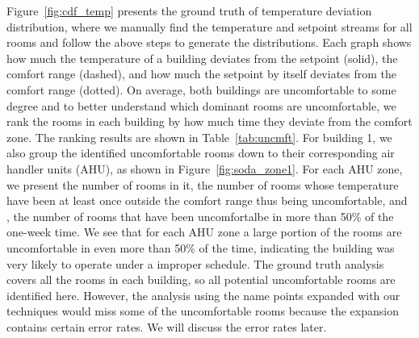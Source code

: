 Figure~\ref{fig:cdf_temp} presents the ground truth of temperature deviation distribution, where we manually find the temperature and setpoint streams for all rooms and follow the above steps to generate the distributions. Each graph shows how much the temperature of a building deviates from the setpoint (solid), the comfort range (dashed), and how much the setpoint by itself deviates from the comfort range (dotted). On average, both buildings are uncomfortable to some degree and to better understand which dominant rooms are uncomfortable, we rank the rooms in each building by how much time they deviate from the comfort zone. The ranking results are shown in Table~\ref{tab:uncmft}. 
For building 1, we also group the identified uncomfortable rooms down to their corresponding air handler units (AHU), as shown in Figure~\ref{fig:soda_zone1}. For each AHU zone, we present the number of rooms in it, the number of rooms whose temperature have been at least once outside the comfort range thus being uncomfortable, and , the number of rooms that have been uncomfortalbe in more than 50\% of the one-week time. We see that for each AHU zone a large portion of the rooms are uncomfortable in even more than 50\% of the time, indicating the building was very likely to operate under a improper schedule. The ground truth analysis covers all the rooms in each building, so all potential uncomfortable rooms are identified here. However, the analysis using the name points expanded with our techniques would miss some of the uncomfortable rooms because the expansion contains certain error rates. We will discuss the error rates later.

